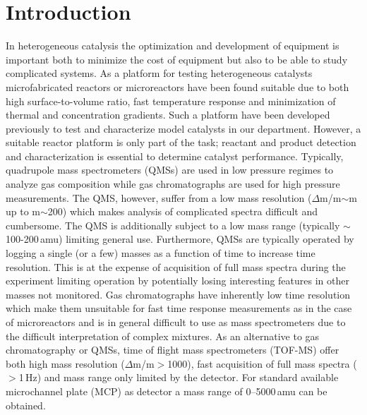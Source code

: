 \documentclass[aip,rsi]{revtex4-1}
\begin{document}
\pacs{}%

\maketitle %

\section{Introduction}
In heterogeneous catalysis the optimization and development of equipment is important both to minimize the cost of equipment but also to be able to study complicated systems. As a platform for testing heterogeneous catalysts microfabricated reactors or microreactors have been found suitable due to both high surface-to-volume ratio, fast temperature response and minimization of thermal and concentration gradients\cite{Jensen2001,Jaehnisch2004}. Such a platform have been developed previously to test and characterize model catalysts in our department\cite{Henriksen2009}. However, a suitable reactor platform is only part of the task; reactant and product detection and characterization is essential to determine catalyst performance. Typically, quadrupole mass spectrometers (QMSs) are used in low pressure regimes to analyze gas composition while gas chromatographs are used for high pressure measurements. The QMS, however, suffer from a low mass resolution ($\Delta$m/m$\sim$m up to m$\sim$200) which makes analysis of complicated spectra difficult and cumbersome. The QMS is additionally subject to a low mass range (typically $\sim$100-200\,amu) limiting general use. Furthermore, QMSs are typically operated by logging a single (or a few) masses as a function of time to increase time resolution. This is at the expense of acquisition of full mass spectra during the experiment limiting operation by potentially losing interesting features in other masses not monitored. Gas chromatographs have inherently low time resolution which make them unsuitable for fast time response measurements as in the case of microreactors and is in general difficult to use as mass spectrometers due to the difficult interpretation of complex mixtures. As an alternative to gas chromatography or QMSs, time of flight mass spectrometers (TOF-MS) offer both high mass resolution ($\Delta$m/m$>$1000), fast acquisition of full mass spectra ($>$1\,Hz) and mass range only limited by the detector. For standard available microchannel plate (MCP) as detector a mass range of 0--5000\,amu can be obtained. 
\end{document}

